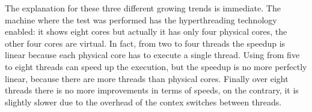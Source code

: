 \documentclass[10pt,twocolumn,letterpaper]{article}
\begin{document}
The explanation for these three different growing trends is immediate. The machine where the test was performed has the hyperthreading technology enabled: it shows eight cores but actually it has only four physical cores, the other four cores are virtual. In fact, from two to four threads the speedup is linear because each physical core has to execute a single thread. Using from five to eight threads can speed up the execution, but the speedup is no more perfectly linear, because there are more threads than physical cores. Finally over eight threads there is no more improvements in terms of speeds, on the contrary, it is slightly slower due to the overhead of the contex switches between threads.
\end{document}
